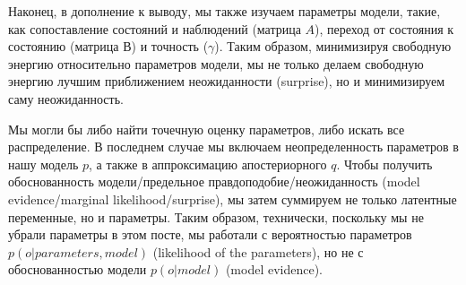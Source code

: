 \documentclass[twoside,leqno, 11pt]{article}
\begin{document}
	\begin{figure}[h]
	\end{figure}
	
	Наконец, в дополнение к выводу, мы также изучаем параметры модели, такие, как сопоставление состояний и наблюдений (матрица $A$), переход от состояния к состоянию (матрица $В$) и точность ($\gamma$). Таким образом, минимизируя свободную энергию относительно параметров модели, мы не только делаем свободную энергию лучшим приближением неожиданности (surprise), но и минимизируем саму неожиданность.
	
	\begin{figure}[h]
	\end{figure}
	
	
	Мы могли бы либо найти точечную оценку параметров, либо искать все распределение. В последнем случае мы включаем неопределенность параметров в нашу модель $p$, а также в аппроксимацию апостериорного $q$. Чтобы получить обоснованность модели/предельное правдоподобие/неожиданность (model evidence/marginal likelihood/surprise), мы затем суммируем не только латентные переменные, но и параметры. Таким образом, технически, поскольку мы не убрали параметры в этом посте, мы работали с вероятностью параметров $p(o|parameters, model)$ (likelihood of the parameters), но не с обоснованностью модели $p(o|model)$ (model evidence).
	
\end{document}
